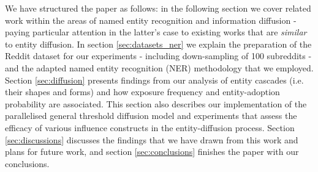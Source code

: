 \documentclass[10pt,journal,compsoc]{IEEEtran}
\begin{document}
We have structured the paper as follows: in the following section we cover related work within the areas of named entity recognition and information diffusion - paying particular attention in the latter's case to existing works that are \emph{similar} to entity diffusion.
In section \ref{sec:datasets_ner} we explain the preparation of the Reddit dataset for our experiments - including down-sampling of 100 subreddits - and the adapted named entity recognition (NER) methodology that we employed.
Section \ref{sec:diffusion} presents findings from our analysis of entity cascades (i.e. their shapes and forms) and how exposure frequency and entity-adoption probability are associated.
This section also describes our implementation of the parallelised general threshold diffusion model and experiments that assess the efficacy of various influence constructs in the entity-diffusion process.
Section \ref{sec:discussions} discusses the findings that we have drawn from this work and plans for future work, and section \ref{sec:conclusions} finishes the paper with our conclusions.


%
%
%
%
\end{document}
